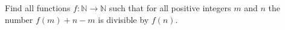 Find all functions $f : \mathbb{N}\rightarrow{\mathbb{N}}$ such that for all positive integers $m$ and $n$ the number $f(m)+n-m$ is divisible by $f(n)$.